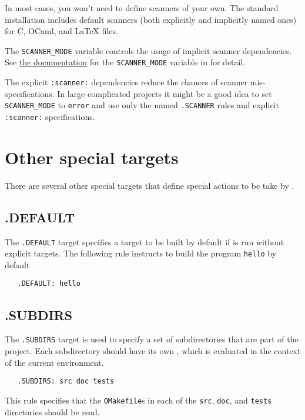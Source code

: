 In most cases, you won't need to define scanners of your own.  The standard installation includes
default scanners (both explicitly and implicitly named ones) for C, OCaml, and LaTeX files.

The \verb+SCANNER_MODE+ variable controls the usage of implicit scanner dependencies. See
\href{omake-root.html#SCANNERMODE}{the documentation} for the \verb+SCANNER_MODE+ variable in
 for detail.

The explicit \verb+:scanner:+ dependencies reduce the chances of scanner mis-specifications. In
large complicated projects it might be a good idea to set \verb+SCANNER_MODE+ to \verb+error+ and
use only the named \verb+.SCANNER+ rules and explicit \verb+:scanner:+ specifications.

\section{Other special targets}

There are several other special targets that define special actions to be take by .

\subsection{.DEFAULT}

The \verb+.DEFAULT+ target specifies a target to be built by default
if  is run without explicit targets.  The following rule
instructs  to build the program \verb+hello+ by default

\begin{verbatim}
   .DEFAULT: hello
\end{verbatim}

\subsection{.SUBDIRS}

The \verb+.SUBDIRS+ target is used to specify a set of subdirectories
that are part of the project.  Each subdirectory should have its own
, which is evaluated in the context of the current
environment.

\begin{verbatim}
   .SUBDIRS: src doc tests
\end{verbatim}

This rule specifies that the \verb+OMakefile+s in each of the \verb+src+, \verb+doc+, and
\verb+tests+ directories should be read.

